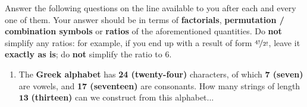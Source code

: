\documentclass[letterpaper,12pt]{article}
\begin{document}
{\large Answer the following questions on the line available to you after each and 
every one of them. Your answer should be in terms of {\bf factorials}, {\bf permutation / combination symbols} or {\bf ratios} of the aforementioned quantities. Do {\bf not} simplify any ratios: for example, if you end up with a result of form $\nicefrac{4!}{2!}$, leave it {\bf exactly as is}; do {\bf not} simplify the ratio to $6$.
}
\begin{enumerate}[label=(\alph*)]
\doublespacing
	\item The {\bf Greek alphabet} has \textbf{24 (twenty-four)} characters, of which \textbf{7 (seven)} \\ are vowels, and \textbf{17 (seventeen) } are consonants. How many strings of length \\ 
$\mathbf{13}$ \textbf{ (thirteen)} can we construct from this alphabet...
		\begin{enumerate}[label=(\roman*)]
		\end{enumerate}


\end{enumerate}
\end{document}
